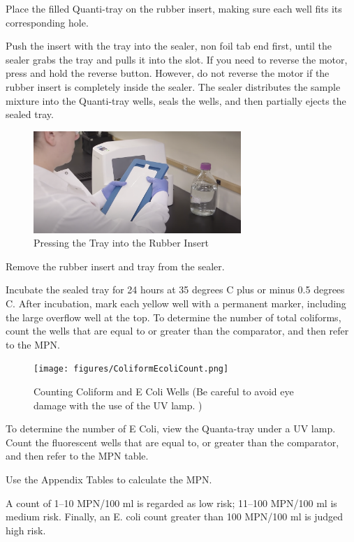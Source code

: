 \documentclass[12pt]{../SOP4_alpha}\usepackage[]{graphicx}\usepackage[]{xcolor}
\begin{document}
\NP Place the filled Quanti-tray on the rubber insert, making sure each well fits its corresponding hole.

\NP Push the insert with the tray into the sealer, non foil tab end first, until the sealer grabs the tray and pulls it into the slot. If you need to reverse the motor, press and hold the reverse button. However, do not reverse the motor if the rubber insert is completely inside the sealer.
The sealer distributes the sample mixture into the Quanti-tray wells, seals the wells, and then partially ejects the sealed tray.

\begin{figure}[h]
\includegraphics[width=0.7\textwidth]{figures/RubberInsert.png}
\caption{Pressing the Tray into the Rubber Insert}
\end{figure}

\NP Remove the rubber insert and tray from the sealer.

\NP Incubate the sealed tray for 24 hours at 35 degrees C plus or minus 0.5 degrees C.
\NP After incubation, mark each yellow well with a permanent marker, including the large overflow well at the top. To determine the number of total coliforms, count the wells that are equal to or greater than the comparator, and then refer to the MPN.

\begin{figure}[h]
\centering
\texttt{[image: figures/ColiformEcoliCount.png]}
\caption{Counting Coliform and E Coli Wells (Be careful to avoid eye damage with  the use of the UV lamp.  )}
\end{figure}

\NP To determine the number of E Coli, view the Quanta-tray under a UV lamp. Count the fluorescent wells that are equal to, or greater than the comparator, and then refer to the MPN table.


\NP Use the Appendix Tables to calculate the MPN. 

\NP A count of 1–10 MPN/100 ml is regarded as low risk; 11–100 MPN/100 ml is medium risk. Finally, an E. coli count greater than 100 MPN/100 ml is judged high risk.
\end{document}

